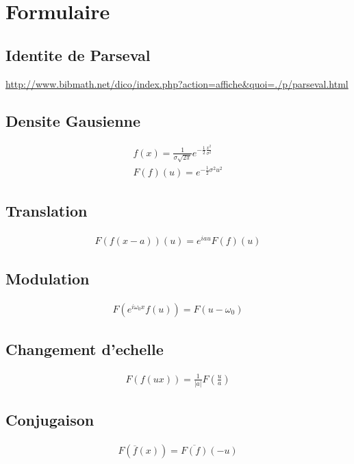 \documentclass[a4paper,11pt]{article}
\begin{document}
\section{Formulaire}
\subsection{Identite de Parseval}

\url{http://www.bibmath.net/dico/index.php?action=affiche&quoi=./p/parseval.html}

\subsection{Densite Gausienne}

\begin{align*}
  f(x) = \frac{1}{\sigma \sqrt{2\pi}} e^{-\frac{1}{2}\frac{x^2}{\sigma^2}}\\
  F(f)(u) = e^{- \frac{1}{2} \sigma^2 u^2}
\end{align*}


\subsection{Translation}
\begin{align*}
  F(f(x-a))(u) = e^{iau} F(f)(u)
\end{align*}

\subsection{Modulation}

\begin{align*}
F(e^{i\omega_0 x} f(u))    = F (u - \omega_0)
\end{align*}

\subsection{Changement d'echelle}
\begin{align*}
  F(f(ux)) = \frac{1}{|a|} F(\frac{u}{a})
\end{align*}

\subsection{Conjugaison}
\begin{align*}
  F(\overline{f}(x)) = \overline{F(f)}(-u)
\end{align*}
\end{document}
